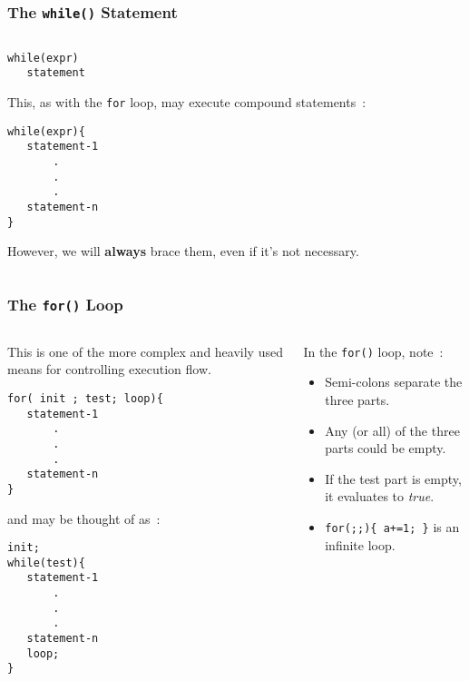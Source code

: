 \begin{frame}[fragile]
\frametitle{The {\tt while()} Statement}
\begin{columns}

\begin{column}{0.45\textwidth}
\begin{lstlisting}[style=basicc,numbers=none]
while(expr)
   statement
\end{lstlisting}

This, as with the {\tt for} loop, may execute compound statements~:

\begin{lstlisting}[style=basicc,numbers=none]
while(expr){
   statement-1
       .
       .
       .
   statement-n
}
\end{lstlisting}
However, we will {\bf always} brace them, even if it's not necessary.
\end{column}

\begin{column}{0.45\textwidth}

\end{column}

\end{columns}
\end{frame}

\begin{frame}[fragile]
\frametitle{The {\tt for()} Loop}
\begin{columns}

\begin{column}{0.45\textwidth}
This is one of the more complex and heavily used means
for controlling execution flow.

\begin{lstlisting}[style=basicc,numbers=none]
for( init ; test; loop){
   statement-1
       .
       .
       .
   statement-n
}
\end{lstlisting}

and may be thought of as~:
\begin{lstlisting}[style=basicc,numbers=none]
init;
while(test){
   statement-1
       .
       .
       .
   statement-n
   loop;
}
\end{lstlisting}
\end{column}

\begin{column}{0.45\textwidth}
In the \verb^for()^ loop, note~:
\begin{itemize}[<+->]
\item Semi-colons separate the three parts.
\item Any (or all) of the three parts could be empty.
\item If the test part is empty, it evaluates to {\it true}.
\item \verb^for(;;){ a+=1; }^  is an infinite loop.
\end{itemize}
\end{column}

\end{columns}
\end{frame}

